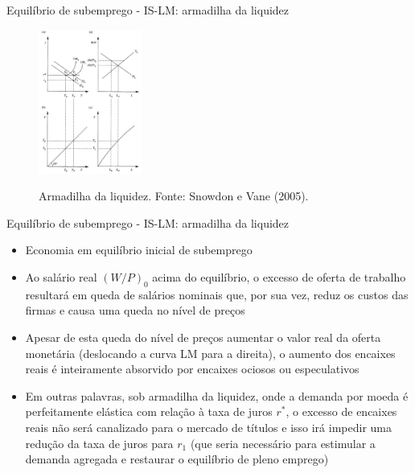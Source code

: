 \documentclass[10pt]{beamer}
\begin{document}
\begin{frame}{Equilíbrio de subemprego - IS-LM: armadilha da liquidez}
    \begin{figure}
        \centering
        \href{https://raw.githubusercontent.com/pvfonseca/pec/main/notas/figures/aula7_fig2.PNG}{\includegraphics[width=0.3\textwidth]{./figures/aula7_fig2.PNG}}
        \caption{Armadilha da liquidez. Fonte: Snowdon e Vane (2005).}
        \label{fig2}
    \end{figure}
\end{frame}

\begin{frame}{Equilíbrio de subemprego - IS-LM: armadilha da liquidez}
    \begin{itemize}
        \item Economia em equilíbrio inicial de subemprego
        \bigskip
        \item Ao salário real $(W/P)_0$ acima do equilíbrio, o excesso de oferta de trabalho resultará em queda de salários nominais que, por sua vez, reduz os custos das firmas e causa uma queda no nível de preços
        \bigskip
        \item Apesar de esta queda do nível de preços aumentar o valor real da oferta monetária (deslocando a curva LM para a direita), o aumento dos encaixes reais é inteiramente absorvido por encaixes ociosos ou especulativos
        \bigskip
        \item Em outras palavras, sob armadilha da liquidez, onde a demanda por moeda é perfeitamente elástica com relação à taxa de juros $r^*$, o excesso de encaixes reais não será canalizado para o mercado de títulos e isso irá impedir uma redução da taxa de juros para $r_1$ (que seria necessário para estimular a demanda agregada e restaurar o equilíbrio de pleno emprego)
    \end{itemize}
\end{frame}
\end{document}
